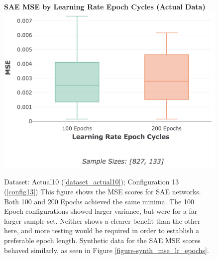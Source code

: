 \documentclass[a4paper,11pt,oneside]{article}
\theoremstyle{plain}
\theoremstyle{definition}
\begin{document}
		\begin{figure}[H]
		\centering 
		\textbf{SAE MSE by Learning Rate Epoch Cycles (Actual Data)}
		\includegraphics[scale=0.3]{images/results/8_appendix/actual_mse_lr_epochs.png}
		\caption[SAE MSE by Learning Rate Epoch Cycles (Actual Data)]{Dataset: Actual10 (\ref{dataset_actual10}); Configuration 13 (\ref{config13})
			\newline This figure shows the MSE scores for SAE networks. Both 100 and 200 Epochs achieved the same minima. The 100 Epoch configurations showed larger variance, but were for a far larger sample set. Neither shows a clearer benefit than the other here, and more testing would be required in order to establish a preferable epoch length. Synthetic data for the SAE MSE scores behaved similarly, as seen in Figure \ref{figure-synth_mse_lr_epochs}.}
		\label{figure-actual_mse_lr_epochs}
	\end{figure}%
	
\end{document}

